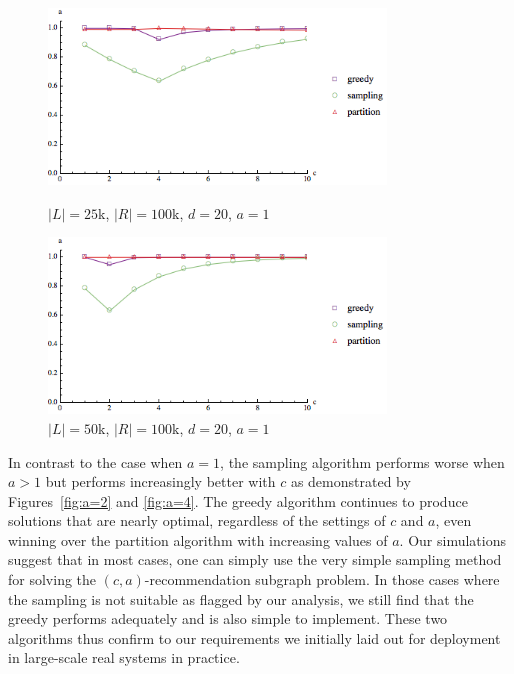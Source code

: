 \begin{figure}[t]
\centering
\begin{minipage}[h]{0.48\textwidth}
\centering
\includegraphics[width=0.8\textwidth]{images/l=25000,r=100000_Greedy_vs_Naive.png}
\caption{$|L|=25$k, $|R|=100$k, $d=20$, $a=1$}\label{fig:a=1:1}
\end{minipage}
\hspace{0cm}
\begin{minipage}[h]{0.48\textwidth}
\centering
\includegraphics[width=0.8\textwidth]{images/l=50000,r=100000_Greedy_vs_Naive.png}
\caption{$|L|=50$k, $|R|=100$k, $d=20$, $a=1$}\label{fig:a=1:2}
\end{minipage}
\vspace{-0.2in}
\end{figure}


\vs
In contrast to the case when $a=1$, the sampling algorithm performs
worse when $a>1$ but performs increasingly better with $c$ as
demonstrated by Figures~\ref{fig:a=2} and \ref{fig:a=4}. The greedy
algorithm continues to produce solutions that are nearly optimal,
regardless of the settings of $c$ and $a$, even winning over the partition algorithm with increasing values of $a$. Our simulations
suggest that in most cases, one can simply use the very simple
sampling method for solving the $(c, a)$-recommendation subgraph
problem. In those cases where the sampling is not suitable as flagged by our analysis,
we still find that the greedy performs adequately and is also simple to implement. These two algorithms thus confirm to our requirements we initially laid out for deployment in large-scale real systems in practice.


